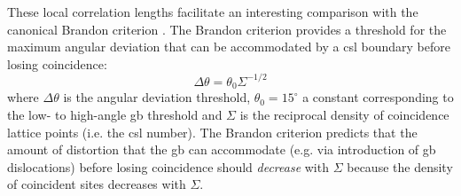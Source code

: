 \documentclass[final,twocolumn,12pt]{elsarticle}
\begin{document}
    
    These local correlation lengths facilitate an interesting comparison with the canonical Brandon criterion \cite{brandonStructureHighangleGrain1966a}. The Brandon criterion provides a threshold for the maximum angular deviation that can be accommodated by a \gls{csl} boundary before losing coincidence:
    \begin{equation}
        \Delta \theta = \theta_0 {\Sigma}^{-1/2}
        \label{eq:brandoncriterion}
    \end{equation}
    where $\Delta \theta$ is the angular deviation threshold, $\theta_0 = 15^{\circ}$ a constant corresponding to the low- to high-angle \gls{gb} threshold and $\Sigma$ is the reciprocal density of coincidence lattice points (i.e. the \gls{csl} number). The Brandon criterion predicts that the amount of distortion that the \gls{gb} can accommodate (e.g. via introduction of \gls{gb} dislocations) before losing coincidence should \emph{decrease} with $\Sigma$ because the density of coincident sites decreases with $\Sigma$.
    
\end{document}
